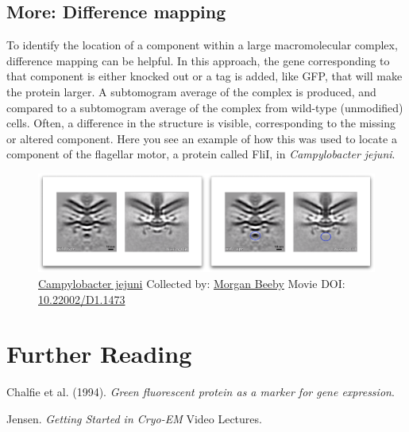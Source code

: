 \documentclass[]{tufte-book}
\begin{document}
\hypertarget{Difference_mapping}{\subsection*{More: Difference
mapping}\label{Difference_mapping}}

To identify the location of a component within a large macromolecular
complex, difference mapping can be helpful. In this approach, the gene
corresponding to that component is either knocked out or a tag is added,
like GFP, that will make the protein larger. A subtomogram average of
the complex is produced, and compared to a subtomogram average of the
complex from wild-type (unmodified) cells. Often, a difference in the
structure is visible, corresponding to the missing or altered component.
Here you see an example of how this was used to locate a component of
the flagellar motor, a protein called FliI, in \emph{Campylobacter
jejuni}.





\begin{figure}
\includegraphics{movie_stills/1_10a} \caption[\protect\hyperlink{tree}{Campylobacter jejuni} Collected by:
\protect\hyperlink{morgan_beeby}{Morgan Beeby} Movie DOI:
\href{https://doi.org/10.22002/D1.1473}{10.22002/D1.1473}]{\protect\hyperlink{tree}{Campylobacter jejuni} Collected by:
\protect\hyperlink{morgan_beeby}{Morgan Beeby} Movie DOI:
\href{https://doi.org/10.22002/D1.1473}{10.22002/D1.1473}}\label{fig:1-10a}
\end{figure}

\section{Further Reading}\label{further-reading}

Chalfie et al. (1994). \emph{Green fluorescent protein as a marker for
gene expression}.\citep{chalfie1994}

Jensen. \emph{Getting Started in Cryo-EM} Video
Lectures.\citep{jensenInternet}
\end{document}
